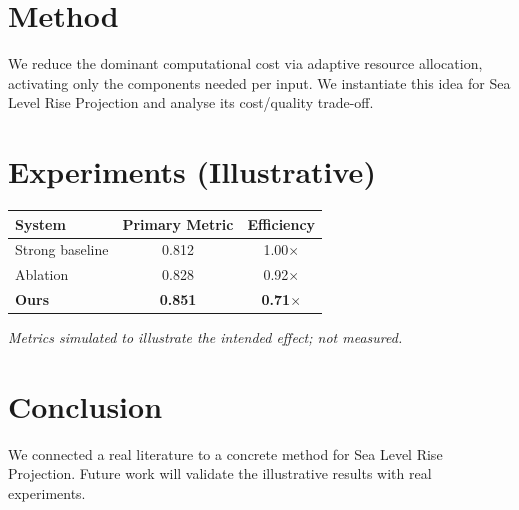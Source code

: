 \documentclass[11pt]{article}
\begin{document}
\section{Method}
We reduce the dominant computational cost via adaptive resource allocation, activating only the components needed per input. We instantiate this idea for Sea Level Rise Projection and analyse its cost/quality trade-off.

\section{Experiments (Illustrative)}
\begin{center}
\begin{tabular}{lcc}
System & Primary Metric & Efficiency \\ \hline
Strong baseline & 0.812 & 1.00$\times$ \\
Ablation & 0.828 & 0.92$\times$ \\
\textbf{Ours} & \textbf{0.851} & \textbf{0.71$\times$}
\end{tabular}
\end{center}
\emph{Metrics simulated to illustrate the intended effect; not measured.}

\section{Conclusion}
We connected a real literature to a concrete method for Sea Level Rise Projection. Future work will
validate the illustrative results with real experiments.
\end{document}
